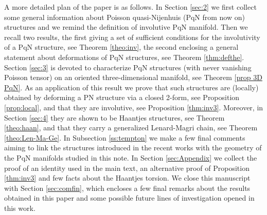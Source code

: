 \documentclass[12pt]{article}
\begin{document}
A more detailed plan of the paper is as follows. In Section \ref{sec:2} we first collect some general information about Poisson quasi-Nijenhuis (PqN from now on) structures and we remind the definition of involutive PqN manifold. Then we recall two results, the first giving a set of sufficient conditions %
for the involutivity of a PqN  structure, see Theorem \ref{theo:inv}, the second enclosing a general statement about 
deformations of PqN structures, see Theorem \ref{thm:defthe}. 
Section \ref{sec:3} is devoted to characterize %
PqN structures (with never vanishing Poisson tensor) on an oriented three-dimensional manifold, see %
Theorem \ref{prop 3D PqN}. %
As an application of this result we prove that such structures are (locally) obtained by deforming a PN structure via a closed 2-form, see Proposition \ref{prop:local}, and that they are involutive, see Proposition \ref{thm:inv3}. Moreover, in Section \ref{sec:4} they are shown to be Haantjes structures, see Theorem \ref{theo:haan}, and that they carry a generalized Lenard-Magri chain, see Theorem \ref{theo:Len-Ma-Ge}. In Subsection \ref{ss:tempton} we make a few final comments aiming to link the structures introduced in the recent works \cite{tempestatondoben, tempestatondo, tempestatondohigher,tempestatondoclass,TondoLag} with the geometry of the PqN 
manifolds studied in this note. 
In Section \ref{sec:Appendix} we collect the proof of an identity used in the main text, an alternative proof of Proposition \ref{thm:inv3} and few facts about the Haantjes torsion. We close this manuscript with Section \ref{sec:comfin}, which encloses a few final remarks about the results obtained in this paper and some possible future lines of investigation opened in this work.
\end{document}
